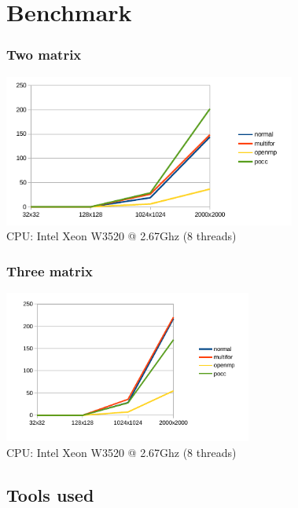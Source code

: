 \documentclass{beamer}
\begin{document}

\section{Benchmark}

\begin{frame}
\frametitle{Two matrix}
\centering
\includegraphics[height=5cm]{pictures/2mmbench} \\
CPU: Intel Xeon W3520 @ 2.67Ghz (8 threads)

\end{frame}


\begin{frame}
\frametitle{Three matrix}
\centering
\includegraphics[height=5cm]{pictures/3mmbench} \\
CPU: Intel Xeon W3520 @ 2.67Ghz (8 threads)
\end{frame}


\subsection{Tools used}
\end{document}
